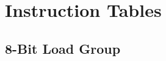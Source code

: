 \documentclass[oneside,a4paper]{book}
\begin{document}
\chapter{Instruction Tables}

\newcommand{\instrheader}{
	\hline
		
		& 
		Symbolic &
		\multicolumn{8}{c}{Flags} & 
		\multicolumn{3}{c}{Opcode} &
		& & 
		M & 
		T & \\

		Mnemonic & 
		Operation &
		SF & ZF & YF & HF & XF & PF & NF & CF &
		76 & 543 & 210 & 
		Hex & Bytes & 
		Cycles & States & 
		Comments \\

	\hline
}

\newcommand{\instrt}{\rule{0pt}{2.7ex}}
\newcommand{\instrb}{\rule[-1.7ex]{0pt}{0pt}}

\newcommand{\notet}{\rule{0pt}{2.4ex}}
\newcommand{\noteb}{\rule[-1.3ex]{0pt}{0pt}}


\startcontents[intrstructionsections]


\section{8-Bit Load Group}
\end{document}
